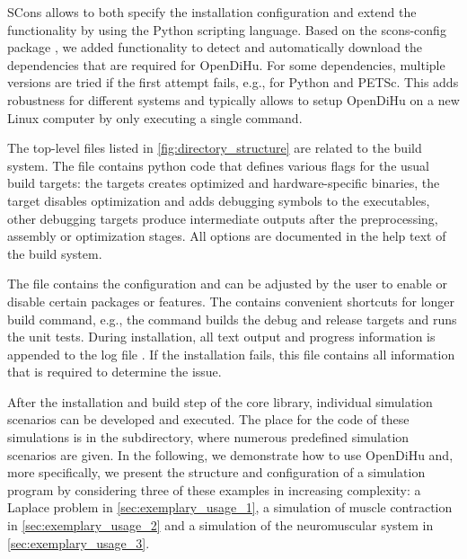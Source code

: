 SCons allows to both specify the installation configuration and extend the functionality by using the Python scripting language. Based on the scons-config package \cite{sconsconfig}, we added functionality to detect and automatically download the dependencies that are required for OpenDiHu. For some dependencies, multiple versions are tried if the first attempt fails, e.g., for Python and PETSc.
This adds robustness for different systems and typically allows to setup OpenDiHu on a new Linux computer by only executing a single  command.

The top-level files listed in \cref{fig:directory_structure} are related to the build system. The file  contains python code that defines various flags for the usual build targets: the  targets creates optimized and hardware-specific binaries, the  target disables optimization and adds debugging symbols to the executables, other debugging targets produce intermediate outputs after the  preprocessing, assembly or optimization stages. All options are documented in the help text of the build system.

The  file contains the configuration and can be adjusted by the user to enable or disable certain packages or features. The  contains convenient shortcuts for longer build command, e.g., the command  builds the debug and release targets and runs the unit tests. During installation, all text output and progress information is appended to the log file . If the installation fails, this file contains all information that is required to determine the issue.

After the installation and build step of the core library, individual simulation scenarios can be developed and executed. The place for the code of these simulations is in the  subdirectory, where numerous predefined simulation scenarios are given. In the following, we demonstrate how to use OpenDiHu and, more specifically, we present the structure and configuration of a simulation program by considering three of these examples in increasing complexity: a Laplace problem in \cref{sec:exemplary_usage_1}, a simulation of muscle contraction in \cref{sec:exemplary_usage_2} and a simulation of the neuromuscular system in \cref{sec:exemplary_usage_3}.

